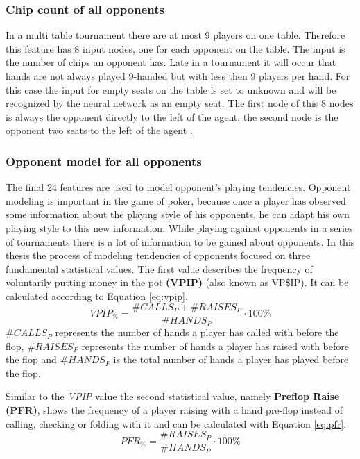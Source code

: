 \subsubsection{Chip count of all opponents}
In a  multi table tournament there are at most 9 players on one table. Therefore this feature has 8 input nodes, one for each opponent on the table. The input is the number of chips an opponent has. Late in a tournament it will occur that hands are not always played 9-handed but with less then 9 players per hand. For this case the input for empty seats on the table is set to unknown and will be recognized by the neural network as an empty seat. The first node of this 8 nodes is always the opponent directly to the left of the agent, the second node is the opponent two seats to the left of the agent \cite{evolutionary_methods}. 
\subsubsection{Opponent model for all opponents}
The final 24 features are used to model opponent's playing tendencies. Opponent modeling is important in the game of poker, because once a player has observed some information about the playing style of his opponents, he can adapt his own playing style to this new information. While playing against opponents in a series of tournaments there is a lot of information to be gained about opponents. In this thesis the process of modeling tendencies of opponents focused on three fundamental statistical values. The first value describes the frequency of voluntarily putting money in the pot \textbf{(VPIP)} (also known as VP\$IP). It can be calculated according to Equation \ref{eq:vpip}.
\begin{equation}
\label{eq:vpip}
VPIP_{\%} = \frac{\#CALLS_{P} + \#RAISES_{P}}{\#HANDS_{P}} \cdot 100\%
\end{equation}
$\#CALLS_{P}$ represents the number of hands a player has called with before the flop, $\#RAISES_{P}$ represents the number of hands a player has raised with before the flop and $\#HANDS_{P}$ is the total number of hands a player has played before the flop.\par
Similar to the \textit{VPIP} value the second statistical value, namely \textbf{Preflop Raise (PFR)}, shows the frequency of a player raising with a hand pre-flop instead of calling, checking or folding with it and can be calculated with Equation \ref{eq:pfr}.
\begin{equation}
\label{eq:pfr}
PFR_{\%} = \frac{\#RAISES_{P}}{\#HANDS_{P}}  \cdot 100\%
\end{equation}
